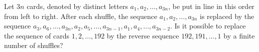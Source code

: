 Let $3n$ cards, denoted by distinct letters $a_1,a_2,\ldots ,a_{3n}$, be put in line in this order from left to right. After each shuffle, the sequence $a_1,a_2,\ldots ,a_{3n}$ is replaced by the sequence $a_3,a_6,\ldots ,a_{3n},a_2,a_5,\ldots ,a_{3n-1},a_1,a_4,\ldots ,a_{3n-2}$. Is it possible to replace the sequence of cards $1,2,\ldots ,192$ by the reverse sequence $192,191,\ldots ,1$ by a finite number of shuffles?